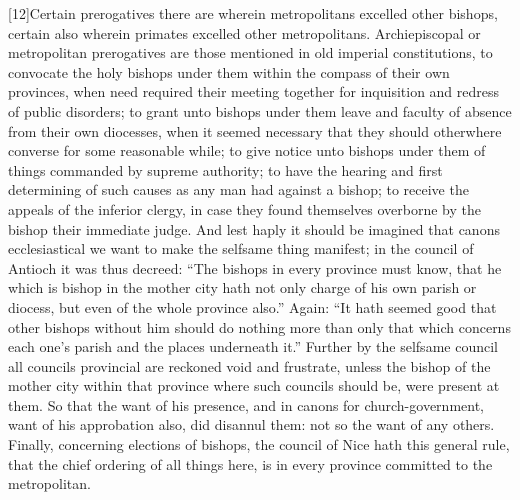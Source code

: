 [12]Certain prerogatives there are wherein metropolitans excelled other bishops, certain also wherein primates excelled other metropolitans. Archiepiscopal or metropolitan prerogatives are those mentioned in old imperial constitutions, to convocate the holy bishops under them within the compass of their own provinces, when need required their meeting together for inquisition and redress of public disorders; to grant unto bishops under them leave and faculty of absence from their own diocesses, when it seemed necessary that they should otherwhere converse for some reasonable while; to give notice unto bishops under them of things commanded by supreme authority; to have the hearing and first determining of such causes as any man had against a bishop; to receive the appeals of the inferior clergy, in case they found themselves overborne by the bishop their immediate judge. And lest haply it should be imagined that canons ecclesiastical we want to make the selfsame thing manifest; in the council of Antioch  it was thus decreed:
 “The bishops in every province must know, that he which is bishop in the mother city hath not only charge of his own parish or diocess, but even of the whole province also.” Again: “It hath seemed good that other bishops without him should do nothing more than only that which concerns each one’s parish and the places underneath it.” Further by the selfsame council all councils provincial are reckoned void and frustrate, unless the bishop of the mother city within that province where such councils should be, were present at them. So that the want of his presence, and in canons for church-government, want of his approbation also, did disannul them: not so the want of any others. Finally, concerning elections of bishops, the council of Nice hath this general rule, that the chief ordering of all things here, is in every province committed to the metropolitan.


